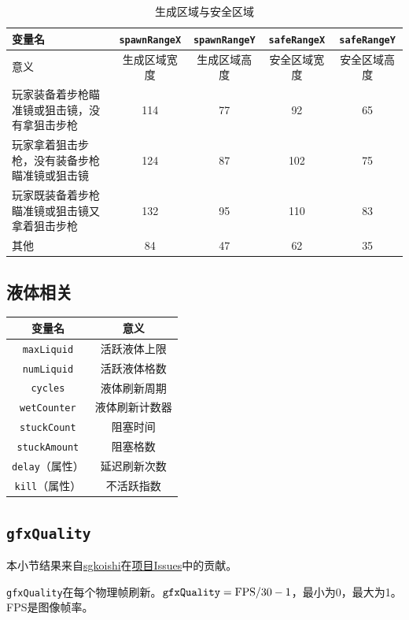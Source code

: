 \begin{table}[!h]
    \centering
    \begin{tabular}{|p{}<{\centering}|c|c|c|c|}
         \hline 变量名&{\lstinline!spawnRangeX!}&{\lstinline!spawnRangeY!}&{\lstinline!safeRangeX!}&{\lstinline!safeRangeY!}  \\\hline
         意义&生成区域宽度&生成区域高度&安全区域宽度&安全区域高度\\\hline
         玩家装备着步枪瞄准镜或狙击镜，没有拿狙击步枪&114&77&92&65\\\hline
         玩家拿着狙击步枪，没有装备步枪瞄准镜或狙击镜&124&87&102&75\\\hline
         玩家既装备着步枪瞄准镜或狙击镜又拿着狙击步枪&132&95&110&83\\\hline
         其他&84&47&62&35\\\hline
    \end{tabular}
    \caption{生成区域与安全区域}
    \label{tab4618}
\end{table}

\subsection{液体相关}\label{tab10}
\begin{longtable}{|c|c|}
\hline 变量名&意义\\\hline
\endhead
{\lstinline!maxLiquid!}&活跃液体上限\\\hline
{\lstinline!numLiquid!}&活跃液体格数\\\hline
{\lstinline!cycles!}&液体刷新周期\\\hline
{\lstinline!wetCounter!}&液体刷新计数器\\\hline
{\lstinline!stuckCount!}&阻塞时间\\\hline
{\lstinline!stuckAmount!}&阻塞格数\\\hline
{\lstinline!delay!}（属性）&延迟刷新次数\\\hline
{\lstinline!kill!}（属性）&不活跃指数\\\hline
\end{longtable}

\subsection{\lstinline{gfxQuality}}\label{app34}
\begin{note}
本小节结果来自\href{https://github.com/sgkoishi}{sgkoishi}在\href{https://github.com/putianyi889/TerrariaWiringTutorial/issues/11#issuecomment-544567689}{项目Issues}中的贡献。
\end{note}
\lstinline{gfxQuality}在每个物理帧刷新。$\mathtt{gfxQuality}=\textnormal{FPS}/30-1$，最小为0，最大为1。FPS是图像帧率。

